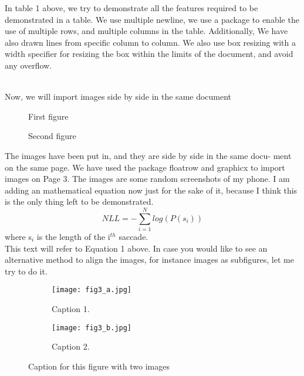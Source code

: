 \documentclass[11pt,a4paper]{article}
\begin{document}
\begin{large}
In table 1 above, we try to demonstrate all the features
required to be demonstrated in a table.  We use multiple
newline, we use a package to enable the use of multiple rows,
and multiple columns in the table.  Additionally, We have
also drawn lines from specific column to column. We also
use box resizing with a width specifier for resizing the box
within the limits of the document, and avoid any overflow.
\end{large} \\

Now, we will import images side by side in the same document

\pagebreak


\begin{figure}[t]
\begin{floatrow}
  {\caption{First figure} \label{img1}}
  {\caption{Second figure} \label{img2}}
\end{floatrow}
\end{figure}

The images have been put in, and they are side by side in the same docu-
ment on the same page. We have used the package floatrow and graphicx to
import images on Page 3. The images are some random screenshots of my
phone. I am adding an mathematical equation now just for the sake of it,
because I think this is the only thing left to be demonstrated.
\begin{equation}
NLL = -\sum_{i=1} ^{N} log(P(s_i))
\end{equation}
where s$_{i}$ is the length of the i$^{th}$ saccade.\\

This text will refer to Equation 1 above. In case you would like to see an
alternative method to align the images, for instance images as subfigures, let
me try to do it.
\pagebreak

\begin{figure}[ht]
  \begin{subfigure}[b]{0.45\textwidth}
    \texttt{[image: fig3\_a.jpg]}
    \caption{Caption 1.}
    \label{fig:f1}
  \end{subfigure}
  \hfill
  \begin{subfigure}[b]{0.45\textwidth}
    \texttt{[image: fig3\_b.jpg]}
    \caption{Caption 2.}
    \label{fig:f2}
  \end{subfigure}
  \caption{Caption for this figure with two images}
\end{figure}
\end{document}
